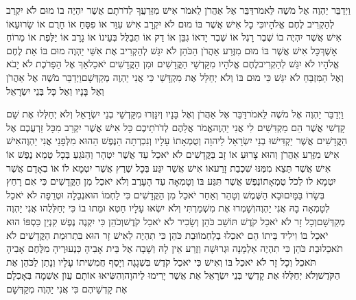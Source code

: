 \documentclass[../main/main.tex]{subfiles}
\begin{document}
\begin{multicols*}{\ncols}
וַיְדַבֵּר יַהְוֶה אֶל מֹשֶׁה לֵּאמֹר\PreVerseSpace{}דַּבֵּר אֶל אַהֲרֹן לֵאמֹר אִישׁ מִזַּרְעֲךָ לְדֹרֹתָם אֲשֶׁר יִהְיֶה בוֹ מוּם לֹא יִקְרַב לְהַקְרִיב לֶחֶם אֱלֹהָיו\PreVerseSpace{}כִּי כָל אִישׁ אֲשֶׁר בּוֹ מוּם לֹא יִקְרָב אִישׁ עִוֵּר אוֹ פִסֵּחַ אוֹ חָרֻם אוֹ שָׂרוּעַ\PreVerseSpace{}אוֹ אִישׁ אֲשֶׁר יִהְיֶה בוֹ שֶׁבֶר רָגֶל אוֹ שֶׁבֶר יָד\PreVerseSpace{}אוֹ גִבֵּן אוֹ דַק אוֹ תְּבַלֻּל בְּעֵינוֹ אוֹ גָרָב אוֹ יַלֶּפֶת אוֹ מְרוֹחַ אָשֶׁךְ\PreVerseSpace{}כָּל אִישׁ אֲשֶׁר בּוֹ מוּם מִזֶּרַע אַהֲרֹן הַכֹּהֵן לֹא יִגַּשׁ לְהַקְרִיב אֶת אִשֵּׁי יַהְוֶה מוּם בּוֹ אֵת לֶחֶם אֱלֹהָיו לֹא יִגַּשׁ לְהַקְרִיב\PreVerseSpace{}לֶחֶם אֱלֹהָיו מִקָּדְשֵׁי הַקֳּדָשִׁים וּמִן הַקֳּדָשִׁים יֹאכֵל\PreVerseSpace{}אַךְ אֶל הַפָּרֹכֶת לֹא יָבֹא וְאֶל הַמִּזְבֵּחַ לֹא יִגַּשׁ כִּי מוּם בּוֹ וְלֹא יְחַלֵּל אֶת מִקְדָּשַׁי כִּי אֲנִי יַהְוֶה מְקַדְּשָׁם\PreVerseSpace{}וַיְדַבֵּר מֹשֶׁה אֶל אַהֲרֹן וְאֶל בָּנָיו וְאֶל כָּל בְּנֵי יִשְׂרָאֵל\OpenSection{}\par
{}וַיְדַבֵּר יַהְוֶה אֶל מֹשֶׁה לֵּאמֹר\PreVerseSpace{}דַּבֵּר אֶל אַהֲרֹן וְאֶל בָּנָיו וְיִנָּזְרוּ מִקָּדְשֵׁי בְנֵי יִשְׂרָאֵל וְלֹא יְחַלְּלוּ אֶת שֵׁם קָדְשִׁי אֲשֶׁר הֵם מַקְדִּשִׁים לִי אֲנִי יַהְוֶה\PreVerseSpace{}אֱמֹר אֲלֵהֶם לְדֹרֹתֵיכֶם כָּל אִישׁ אֲשֶׁר יִקְרַב מִכָּל זַרְעֲכֶם אֶל הַקֳּדָשִׁים אֲשֶׁר יַקְדִּישׁוּ בְנֵי יִשְׂרָאֵל לַיהוָה וְטֻמְאָתוֹ עָלָיו וְנִכְרְתָה הַנֶּפֶשׁ הַהוּא מִלְּפָנַי אֲנִי יַהְוֶה\PreVerseSpace{}אִישׁ אִישׁ מִזֶּרַע אַהֲרֹן וְהוּא צָרוּעַ אוֹ זָב בַּקֳּדָשִׁים לֹא יֹאכַל עַד אֲשֶׁר יִטְהָר וְהַנֹּגֵעַ בְּכָל טְמֵא נֶפֶשׁ אוֹ אִישׁ אֲשֶׁר תֵּצֵא מִמֶּנּוּ שִׁכְבַת זָרַע\PreVerseSpace{}אוֹ אִישׁ אֲשֶׁר יִגַּע בְּכָל שֶׁרֶץ אֲשֶׁר יִטְמָא לוֹ אוֹ בְאָדָם אֲשֶׁר יִטְמָא לוֹ לְכֹל טֻמְאָתוֹ\PreVerseSpace{}נֶפֶשׁ אֲשֶׁר תִּגַּע בּוֹ וְטָמְאָה עַד הָעָרֶב וְלֹא יֹאכַל מִן הַקֳּדָשִׁים כִּי אִם רָחַץ בְּשָׂרוֹ בַּמָּיִם\PreVerseSpace{}וּבָא הַשֶּׁמֶשׁ וְטָהֵר וְאַחַר יֹאכַל מִן הַקֳּדָשִׁים כִּי לַחְמוֹ הוּא\PreVerseSpace{}נְבֵלָה וּטְרֵפָה לֹא יֹאכַל לְטָמְאָה בָהּ אֲנִי יַהְוֶה\PreVerseSpace{}וְשָׁמְרוּ אֶת מִשְׁמַרְתִּי וְלֹא יִשְׂאוּ עָלָיו חֵטְא וּמֵתוּ בוֹ כִּי יְחַלְּלֻהוּ אֲנִי יַהְוֶה מְקַדְּשָׁם\PreVerseSpace{}וְכָל זָר לֹא יֹאכַל קֹדֶשׁ תּוֹשַׁב כֹּהֵן וְשָׂכִיר לֹא יֹאכַל קֹדֶשׁ\PreVerseSpace{}וְכֹהֵן כִּי יִקְנֶה נֶפֶשׁ קִנְיַן כַּסְפּוֹ הוּא יֹאכַל בּוֹ וִילִיד בֵּיתוֹ הֵם יֹאכְלוּ בְלַחְמוֹ\PreVerseSpace{}וּבַת כֹּהֵן כִּי תִהְיֶה לְאִישׁ זָר הוּא בִּתְרוּמַת הַקֳּדָשִׁים לֹא תֹאכֵל\PreVerseSpace{}וּבַת כֹּהֵן כִּי תִהְיֶה אַלְמָנָה וּגְרוּשָׁה וְזֶרַע אֵין לָהּ וְשָׁבָה אֶל בֵּית אָבִיהָ כִּנְעוּרֶיהָ מִלֶּחֶם אָבִיהָ תֹּאכֵל וְכָל זָר לֹא יֹאכַל בּוֹ \ClosedSection{}וְאִישׁ כִּי יֹאכַל קֹדֶשׁ בִּשְׁגָגָה וְיָסַף חֲמִשִׁיתוֹ עָלָיו וְנָתַן לַכֹּהֵן אֶת הַקֹּדֶשׁ\PreVerseSpace{}וְלֹא יְחַלְּלוּ אֶת קָדְשֵׁי בְּנֵי יִשְׂרָאֵל אֵת אֲשֶׁר יָרִימוּ לַיהוָה\PreVerseSpace{}וְהִשִּׂיאוּ אוֹתָם עֲוֺן אַשְׁמָה בְּאָכְלָם אֶת קָדְשֵׁיהֶם כִּי אֲנִי יַהְוֶה מְקַדְּשָׁם\OpenSection{}\par

\end{multicols*}
\end{document}
